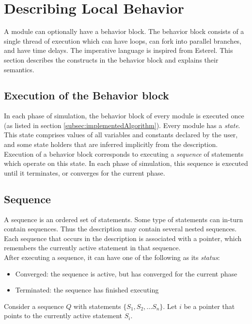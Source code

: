 \documentclass[12pt,a4paper]{report}
\begin{document}
	




	\section{Describing Local Behavior}
	A module can optionally have a behavior block. 
	The behavior block consists of a single thread of execution
	which can have loops, can fork into parallel branches,
	and have time delays. The imperative language is
	inspired from Esterel\cite{esterel}.
	This section describes the constructs in the behavior block
	and explains their semantics.\\

	\subsection{Execution of the Behavior block}
	In each phase of simulation, the behavior block
	of every module is executed once (as listed in section \ref{subsec:implementedAlgorithm}).
	Every module has a \emph{state}. This state comprises values of all variables and
	constants declared by the user, and some state holders that are
	inferred implicitly from the description.  Execution of a behavior block
	corresponds to executing a \emph{sequence} of statements which operate
	on this state. In each phase of simulation, this sequence is executed
	until it terminates, or converges for the current phase.\\

	\subsection{Sequence}
	A sequence is an ordered set of statements.
	Some type of statements can in-turn contain sequences.
	Thus the description may contain several nested sequences. 
	Each sequence that occurs in the description is associated with a pointer, 
	which remembers the currently active statement in that sequence.\\


	After executing a sequence, it can have 
	one of the following as its \emph{status}:
	\begin{itemize}
	\item Converged: the sequence is active, but has converged for the current phase
	\item Terminated: the sequence has finished executing
	\end{itemize}


	Consider a sequence $Q$ with statements
	$\{S_1,S_2,...S_n\}$. Let $i$ be a pointer that points 
	to the currently active statement $S_i$.\\
\end{document}
